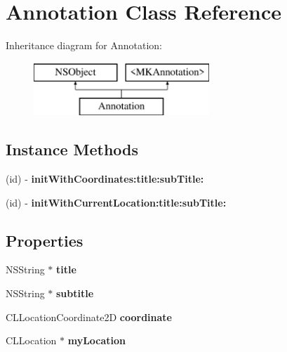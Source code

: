 \hypertarget{interface_annotation}{\section{Annotation Class Reference}
\label{interface_annotation}
}
Inheritance diagram for Annotation\-:\begin{figure}[H]
\begin{center}
\leavevmode
\includegraphics[height=2.000000cm]{interface_annotation}
\end{center}
\end{figure}
\subsection*{Instance Methods}
\begin{DoxyCompactItemize}
\item 
\hypertarget{interface_annotation_a80ea37b6effd63b6e28f4a6d2e09e368}{(id) -\/ {\bfseries init\-With\-Coordinates\-:title\-:sub\-Title\-:}}\label{interface_annotation_a80ea37b6effd63b6e28f4a6d2e09e368}

\item 
\hypertarget{interface_annotation_afe10e6753cb7a873afee6b594b108c93}{(id) -\/ {\bfseries init\-With\-Current\-Location\-:title\-:sub\-Title\-:}}\label{interface_annotation_afe10e6753cb7a873afee6b594b108c93}

\end{DoxyCompactItemize}
\subsection*{Properties}
\begin{DoxyCompactItemize}
\item 
\hypertarget{interface_annotation_ad39b2fbc36bb32f1287f61db3d3477a1}{N\-S\-String $\ast$ {\bfseries title}}\label{interface_annotation_ad39b2fbc36bb32f1287f61db3d3477a1}

\item 
\hypertarget{interface_annotation_a0a45434fe346246a8e5d34d549699191}{N\-S\-String $\ast$ {\bfseries subtitle}}\label{interface_annotation_a0a45434fe346246a8e5d34d549699191}

\item 
\hypertarget{interface_annotation_aa284dfc828e69ed8a933afa71bcd119d}{C\-L\-Location\-Coordinate2\-D {\bfseries coordinate}}\label{interface_annotation_aa284dfc828e69ed8a933afa71bcd119d}

\item 
\hypertarget{interface_annotation_a56fca18cb47891920139fa1c239ba39c}{C\-L\-Location $\ast$ {\bfseries my\-Location}}\label{interface_annotation_a56fca18cb47891920139fa1c239ba39c}

\end{DoxyCompactItemize}


